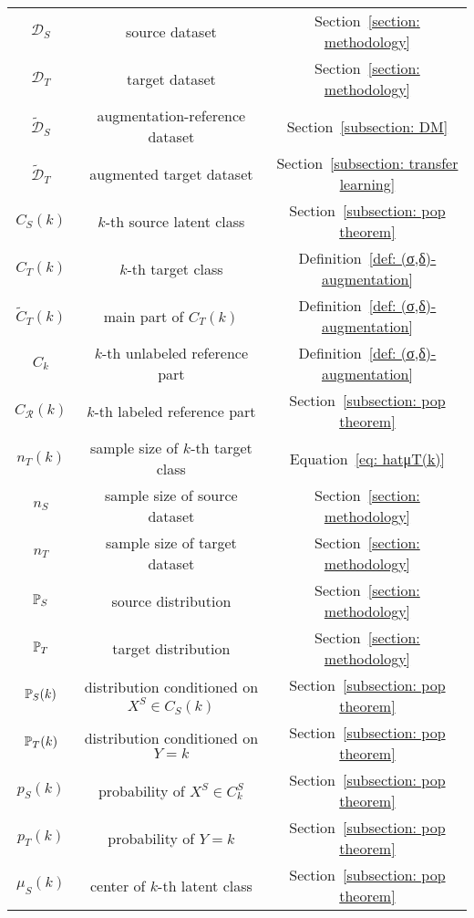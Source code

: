 \begin{longtable}{@{}ccc@{}}
    $\mathcal{D}_S$ & source dataset                     &   Section~\ref{section: methodology}       \\
    $\mathcal{D}_T$ & target dataset                     &   Section~\ref{section: methodology}       \\
    $\widetilde{\mathcal{D}}_S$ & augmentation-reference dataset &  Section~\ref{subsection: DM}        \\
    $\widetilde{\mathcal{D}}_T$ & augmented target dataset  &    Section~\ref{subsection: transfer learning}      \\
    $C_S(k)$  & $k$-th source latent class            &   Section~\ref{subsection: pop theorem}      \\
    $C_T(k)$  & $k$-th target class                   &   Definition~\ref{def: (σ,δ)-augmentation}       \\
    $\widetilde{C}_T(k)$ & main part of $C_T(k)$   &      Definition~\ref{def: (σ,δ)-augmentation}    \\
    $C_k$     & $k$-th unlabeled reference part &  Definition~\ref{def: (σ,δ)-augmentation}      \\
    $C_\mathcal{R}(k)$ & $k$-th labeled reference part &   Section~\ref{subsection: pop theorem}    \\
    $n_T(k)$  & sample size of $k$-th target class  &     Equation~\eqref{eq: hatμT(k)}     \\
    $n_S$     & sample size of source dataset       &   Section~\ref{section: methodology}       \\
    $n_T$     & sample size of target dataset   &   Section~\ref{section: methodology}       \\
    $\P_S$    & source distribution        &  Section~\ref{section: methodology}        \\
    $\P_T$    & target distribution &    Section~\ref{section: methodology}      \\
    $\P_S(k)$ & distribution conditioned on $X^S \in C_S(k)$ &  Section~\ref{subsection: pop theorem}       \\
    $\P_T(k)$ & distribution conditioned on $Y = k$ &  Section~\ref{subsection: pop theorem}     \\
    $p_S(k)$  & probability of $X^S \in C^S_k$ & Section~\ref{subsection: pop theorem}          \\
    $p_T(k)$  & probability of $Y = k$ & Section~\ref{subsection: pop theorem}       \\
    $\mu_S(k)$ & center of $k$-th latent class & Section~\ref{subsection: pop theorem}       \\

\end{longtable}
